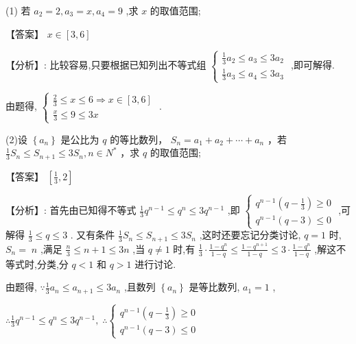 \documentclass[10pt]{article}
\begin{document}
(1) 若 \({a}_{2} = 2,{a}_{3} = x,{a}_{4} = 9\) ,求 \(x\) 的取值范围;

【答案】 \(x \in  \left\lbrack  {3,6}\right\rbrack\)

【分析】: 比较容易,只要根据已知列出不等式组 \(\left\{  \begin{array}{l} \frac{1}{3}{a}_{2} \leq  {a}_{3} \leq  3{a}_{2} \\  \frac{1}{3}{a}_{3} \leq  {a}_{4} \leq  3{a}_{3} \end{array}\right.\) ,即可解得.

由题得, \(\left\{  \begin{array}{l} \frac{2}{3} \leq  x \leq  6 \Rightarrow  x \in  \left\lbrack  {3,6}\right\rbrack  \\  \frac{x}{3} \leq  9 \leq  {3x} \end{array}\right.\) .

(2)设 \(\left\{  {a}_{n}\right\}\) 是公比为 \(q\) 的等比数列， \({S}_{n} = {a}_{1} + {a}_{2} + \cdots  + {a}_{n}\) ，若 \(\frac{1}{3}{S}_{n} \leq  {S}_{n + 1} \leq  3{S}_{n},n \in  {N}^{ * }\) ，求 \(q\) 的取值范围;

【答案】 \(\left\lbrack  {\frac{1}{3},2}\right\rbrack\)

【分析】: 首先由已知得不等式 \(\frac{1}{3}{q}^{n - 1} \leq  {q}^{n} \leq  3{q}^{n - 1}\) ,即 \(\left\{  \begin{array}{l} {q}^{n - 1}\left( {q - \frac{1}{3}}\right)  \geq  0 \\  {q}^{n - 1}\left( {q - 3}\right)  \leq  0 \end{array}\right.\) ,可解得 \(\frac{1}{3} \leq  q \leq  3\) . 又有条件 \(\frac{1}{3}{S}_{n} \leq  {S}_{n + 1} \leq  3{S}_{n}\) ,这时还要忘记分类讨论, \(q = 1\) 时, \({S}_{n} = \; n\) ,满足 \(\frac{n}{3} \leq  n + 1 \leq  {3n}\) ,当 \(q \neq  1\) 时,有 \(\frac{1}{3} \cdot  \frac{1 - {q}^{n}}{1 - q} \leq  \frac{1 - {q}^{n + 1}}{1 - q} \leq  3 \cdot  \frac{1 - {q}^{n}}{1 - q}\) ,解这不等式时,分类,分 \(q < 1\) 和 \(q > 1\) 进行讨论.

由题得, \(\because \frac{1}{3}{a}_{n} \leq  {a}_{n + 1} \leq  3{a}_{n}\) ,且数列 \(\left\{  {a}_{n}\right\}\) 是等比数列, \({a}_{1} = 1\) ,

\(\therefore \frac{1}{3}{q}^{n - 1} \leq  {q}^{n} \leq  3{q}^{n - 1},\;\therefore \left\{  \begin{array}{l} {q}^{n - 1}\left( {q - \frac{1}{3}}\right)  \geq  0 \\  {q}^{n - 1}\left( {q - 3}\right)  \leq  0 \end{array}\right.\)
\end{document}
